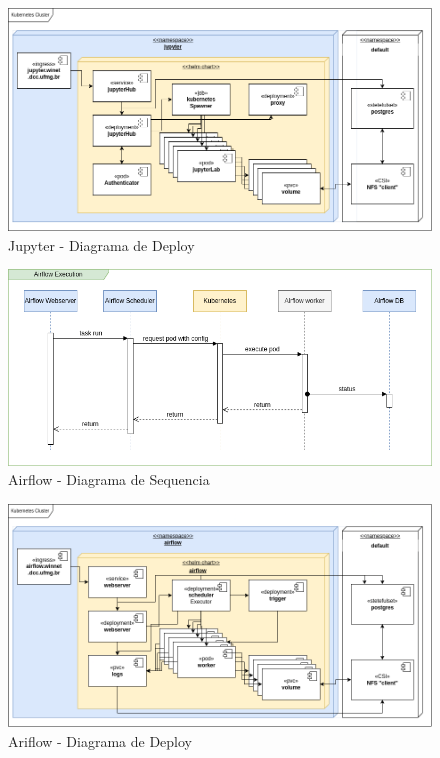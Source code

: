 \documentclass[10pt,brazil]{beamer}
\theoremstyle{definition}
\begin{document}
\begin{frame}[plain]
\begin{figure}
\begin{center}
\begin{overprint}
      \includegraphics[width=1\textwidth]{deploy-jupy-12.png}
    \end{overprint}
  \end{center}  
      \caption[Jupyter Deploy]{Jupyter - Diagrama de Deploy}
  \end{figure}  
\end{frame}

\begin{frame}[plain]
  \hspace*{-10mm}
    \begin{figure}
    \centering  
  \includegraphics[width=.85\paperwidth]{airflow_sequence.png}
      \caption[Airflow - Diagrama de Sequencia]{Airflow - Diagrama de Sequencia}
  \end{figure}  
\end{frame}

\begin{frame}[plain]
  \hspace*{-10mm}
  \begin{figure}
    \centering  
  \includegraphics[width=0.85\paperwidth]{tcc_airflow_deloy.png}
  \caption[AirFlow Deploy]{Ariflow - Diagrama de Deploy}
\end{figure}
\end{frame}
\end{document}
